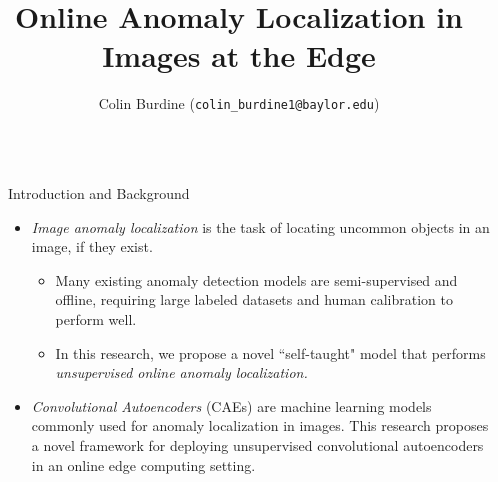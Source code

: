 \documentclass[final,hyperref={pdfpagelabels=false}]{beamer}
\title{\Huge Online Anomaly Localization in \\ Images at the Edge} %
\author{Colin Burdine \hspace{1cm} (\texttt{colin\_burdine1@baylor.edu})} %
\institute{SULI Intern $\mid$ Argonne National Laboratory $\mid$ MCS Division} %
\begin{document}

\begin{frame}[t] %

\begin{columns}[t] %

\begin{column}{.02\textwidth}\end{column} %

\begin{column}{.465\textwidth} %

            
\begin{block}{Introduction and Background}
\begin{itemize}
\item \textit{Image anomaly localization} is the task of locating uncommon objects in an image, if they exist.

\begin{itemize}
\item Many existing anomaly detection models are semi-supervised and offline, requiring large labeled datasets and human calibration to perform well.

\item In this research, we propose a novel ``self-taught" model that performs \textit{unsupervised online anomaly localization.}
\end{itemize}

\item \textit{Convolutional Autoencoders} (CAEs) are machine learning models commonly used for anomaly localization in images.  This research proposes a novel framework for deploying unsupervised convolutional autoencoders in an online edge computing setting.\\[4mm]


\end{itemize}
\end{block}
\end{column}
\end{columns}
\end{frame}
\end{document}
